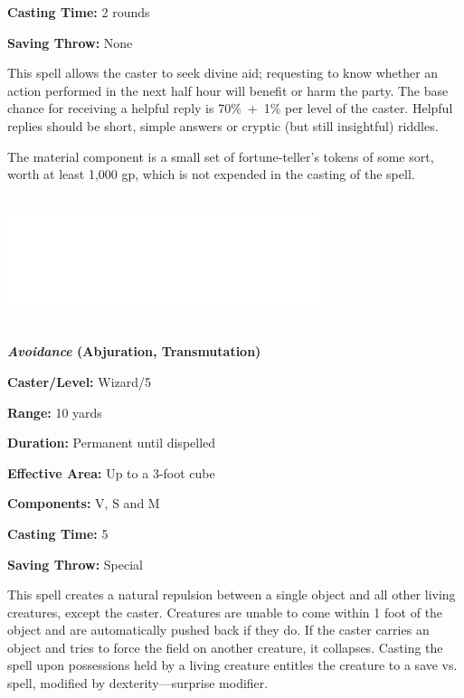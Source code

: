 \begin{multicols}{2}
\begin{minipage}{\columnwidth}
\noindent \textbf{Casting Time:} 2 rounds

\noindent \textbf{Saving Throw:} None

\end{minipage}

This spell allows the caster to seek divine aid; requesting to know whether an action performed in the next half hour will benefit or harm the party.  The base chance for receiving a helpful reply is 70\%~+~1\% per level of the caster.  Helpful replies should be short, simple answers or cryptic (but still insightful) riddles.

The material component is a small set of fortune-teller's tokens of some sort, worth at least 1,000 gp, which is not expended in the casting of the spell.

\noindent\includegraphics[width=3.6in, height=1.5in]{testblock.pdf} 

\vspace{1em}
 
\noindent
\begin{minipage}{\columnwidth}

\noindent \textbf{\textit{Avoidance} (Abjuration, Transmutation)}

\noindent \textbf{Caster/Level:} Wizard/5

\noindent \textbf{Range:} 10 yards

\noindent \textbf{Duration:} Permanent until dispelled

\noindent \textbf{Effective Area:} Up to a 3-foot cube

\noindent \textbf{Components:} V, S and M

\noindent \textbf{Casting Time:} 5

\noindent \textbf{Saving Throw:} Special

\end{minipage}

This spell creates a natural repulsion between a single object and all other living creatures, except the caster.  Creatures are unable to come within 1 foot of the object and are automatically pushed back if they do.  If the caster carries an object and tries to force the field on another creature, it collapses.  Casting the spell upon possessions held by a living creature entitles the creature to a save vs. spell, modified by dexterity---surprise modifier.


\end{multicols}
